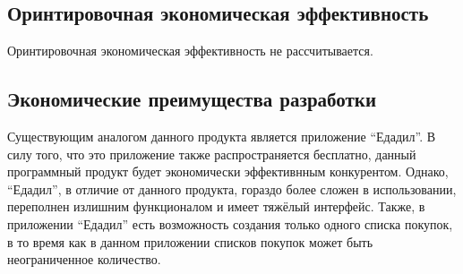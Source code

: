\subsection{Оринтировочная экономическая эффективность}
Оринтировочная экономическая эффективность не рассчитывается.

\subsection{Экономические преимущества разработки}
Существующим аналогом данного продукта является приложение ``Едадил''. В силу
того, что это приложение также распространяется бесплатно, данный программный
продукт будет экономически эффективнным конкурентом. Однако, ``Едадил'', в
отличие от данного продукта, гораздо более сложен в использовании, переполнен
излишним функционалом и имеет тяжёлый интерфейс. Также, в приложении ``Едадил''
есть возможность создания только одного списка покупок, в то время как в данном
приложении списков покупок может быть неограниченное количество.

